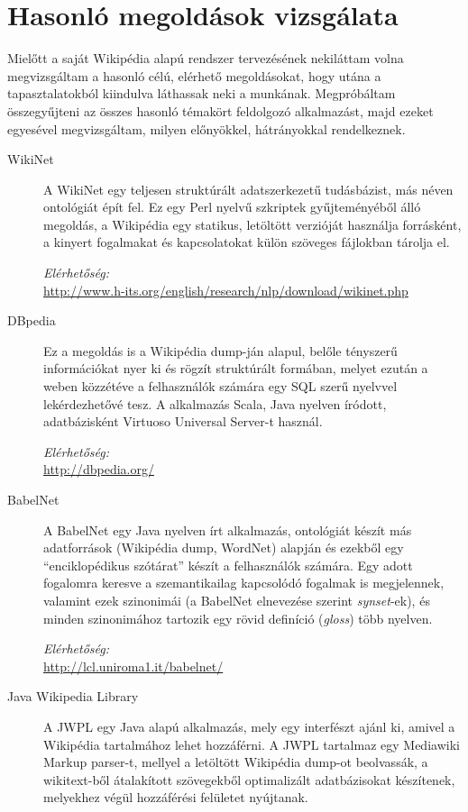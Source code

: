 \chapter{Hasonló megoldások vizsgálata}
\label{cha:related_work}

Mielőtt a saját Wikipédia alapú rendszer tervezésének nekiláttam volna megvizsgáltam a hasonló célú, elérhető megoldásokat, hogy utána a tapasztalatokból kiindulva láthassak neki a munkának. Megpróbáltam összegyűjteni az összes hasonló témakört feldolgozó alkalmazást, majd ezeket egyesével megvizsgáltam, milyen előnyökkel, hátrányokkal rendelkeznek.

\begin{description}
	\item[WikiNet\cite{wikinet}] A WikiNet egy teljesen struktúrált adatszerkezetű tudásbázist, más néven ontológiát épít fel. Ez egy Perl nyelvű szkriptek gyűjteményéből álló megoldás, a Wikipédia egy statikus, letöltött verzióját használja forrásként, a kinyert fogalmakat és kapcsolatokat külön szöveges fájlokban tárolja el.
	
\textit{Elérhetőség:}\\
\url{http://www.h-its.org/english/research/nlp/download/wikinet.php}

	\item[DBpedia] Ez a megoldás is a Wikipédia dump-ján alapul, belőle tényszerű információkat nyer ki és rögzít struktúrált formában, melyet ezután a weben közzétéve a felhasználók számára egy SQL szerű nyelvvel lekérdezhetővé tesz. A alkalmazás Scala, Java nyelven íródott, adatbázisként Virtuoso Universal Server-t használ.
	
\textit{Elérhetőség:}\\
\url{http://dbpedia.org/}

\item[BabelNet\cite{babelnet}] A BabelNet egy Java nyelven írt alkalmazás, ontológiát készít más adatforrások (Wikipédia dump, WordNet) alapján és ezekből egy ``enciklopédikus szótárat'' készít a felhasználók számára. Egy adott fogalomra keresve a szemantikailag kapcsolódó fogalmak is megjelennek, valamint ezek szinonimái (a BabelNet elnevezése szerint \textit{synset}-ek), és minden szinonimához tartozik egy rövid definíció (\textit{gloss}) több nyelven.
	
\textit{Elérhetőség:}\\
\url{http://lcl.uniroma1.it/babelnet/}

\item[Java Wikipedia Library\cite{jwpl}] A JWPL egy Java alapú alkalmazás, mely egy interfészt ajánl ki, amivel a Wikipédia tartalmához lehet hozzáférni. A JWPL tartalmaz egy Mediawiki Markup parser-t, mellyel a letöltött Wikipédia dump-ot beolvassák, a wikitext-ből átalakított szövegekből optimalizált adatbázisokat készítenek, melyekhez végül hozzáférési felületet nyújtanak.
	

\end{description}
